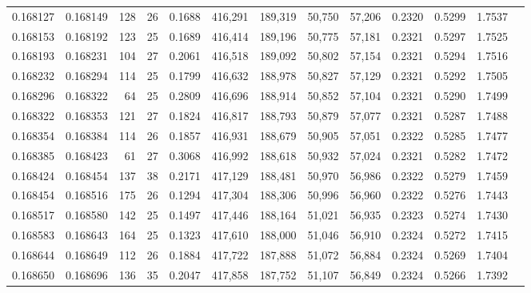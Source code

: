 \begin{tabular}{rrrrrrrrrrrrr}
0.168127 & 0.168149 & 128 &  26 &                                     0.1688 & 416,291 & 189,319 &  50,750 &  57,206 & 0.2320 & 0.5299 & 1.7537 \\
0.168153 & 0.168192 & 123 &  25 &                                     0.1689 & 416,414 & 189,196 &  50,775 &  57,181 & 0.2321 & 0.5297 & 1.7525 \\
0.168193 & 0.168231 & 104 &  27 &                                     0.2061 & 416,518 & 189,092 &  50,802 &  57,154 & 0.2321 & 0.5294 & 1.7516 \\
0.168232 & 0.168294 & 114 &  25 &                                     0.1799 & 416,632 & 188,978 &  50,827 &  57,129 & 0.2321 & 0.5292 & 1.7505 \\
0.168296 & 0.168322 &  64 &  25 &                                     0.2809 & 416,696 & 188,914 &  50,852 &  57,104 & 0.2321 & 0.5290 & 1.7499 \\
0.168322 & 0.168353 & 121 &  27 &                                     0.1824 & 416,817 & 188,793 &  50,879 &  57,077 & 0.2321 & 0.5287 & 1.7488 \\
0.168354 & 0.168384 & 114 &  26 &                                     0.1857 & 416,931 & 188,679 &  50,905 &  57,051 & 0.2322 & 0.5285 & 1.7477 \\
0.168385 & 0.168423 &  61 &  27 &                                     0.3068 & 416,992 & 188,618 &  50,932 &  57,024 & 0.2321 & 0.5282 & 1.7472 \\
0.168424 & 0.168454 & 137 &  38 &                                     0.2171 & 417,129 & 188,481 &  50,970 &  56,986 & 0.2322 & 0.5279 & 1.7459 \\
0.168454 & 0.168516 & 175 &  26 &                                     0.1294 & 417,304 & 188,306 &  50,996 &  56,960 & 0.2322 & 0.5276 & 1.7443 \\
0.168517 & 0.168580 & 142 &  25 &                                     0.1497 & 417,446 & 188,164 &  51,021 &  56,935 & 0.2323 & 0.5274 & 1.7430 \\
0.168583 & 0.168643 & 164 &  25 &                                     0.1323 & 417,610 & 188,000 &  51,046 &  56,910 & 0.2324 & 0.5272 & 1.7415 \\
0.168644 & 0.168649 & 112 &  26 &                                     0.1884 & 417,722 & 187,888 &  51,072 &  56,884 & 0.2324 & 0.5269 & 1.7404 \\
0.168650 & 0.168696 & 136 &  35 &                                     0.2047 & 417,858 & 187,752 &  51,107 &  56,849 & 0.2324 & 0.5266 & 1.7392 \\

\end{tabular}
